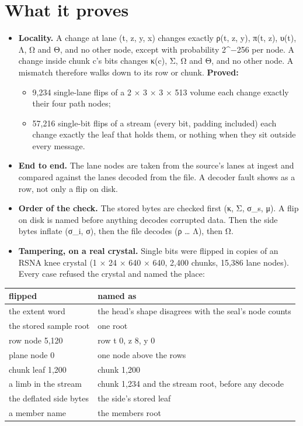 \section{\texorpdfstring{What it proves}{What it proves}}

\begin{itemize}
\item \textbf{Locality.} A change at lane (t, z, y, x) changes exactly ρ(t, z, y), π(t, z), υ(t), Λ, Ω and Θ, and no other node, except with probability 2\textasciicircum{}−256 per node. A change inside chunk c's bits changes κ(c), Σ, Ω and Θ, and no other node. A mismatch therefore walks down to its row or chunk. \textbf{Proved:}

\begin{itemize}
\item 9,234 single-lane flips of a 2 × 3 × 3 × 513 volume each change exactly their four path nodes;
\item 57,216 single-bit flips of a stream (every bit, padding included) each change exactly the leaf that holds them, or nothing when they sit outside every message.
\end{itemize}
\item \textbf{End to end.} The lane nodes are taken from the source's lanes at ingest and compared against the lanes decoded from the file. A decoder fault shows as a row, not only a flip on disk.
\item \textbf{Order of the check.} The stored bytes are checked first (κ, Σ, σ\_\allowbreak{}s, μ). A flip on disk is named before anything decodes corrupted data. Then the side bytes inflate (σ\_\allowbreak{}i, σ), then the file decodes (ρ … Λ), then Ω.
\item \textbf{Tampering, on a real crystal.} Single bits were flipped in copies of an RSNA knee crystal (1 × 24 × 640 × 640, 2,400 chunks, 15,386 lane nodes). Every case refused the crystal and named the place:
\end{itemize}

{\small
\setlength{\tabcolsep}{6pt}
\begin{longtable}{>{\RaggedRight\arraybackslash}p{}>{\RaggedRight\arraybackslash}p{}}
\toprule
flipped & named as \\
\midrule
\endhead
the extent word & the head's shape disagrees with the seal's node counts \\
the stored sample root & one root \\
row node 5,120 & row t 0, z 8, y 0 \\
plane node 0 & one node above the rows \\
chunk leaf 1,200 & chunk 1,200 \\
a limb in the stream & chunk 1,234 and the stream root, before any decode \\
the deflated side bytes & the side's stored leaf \\
a member name & the members root \\
\bottomrule
\end{longtable}
}

